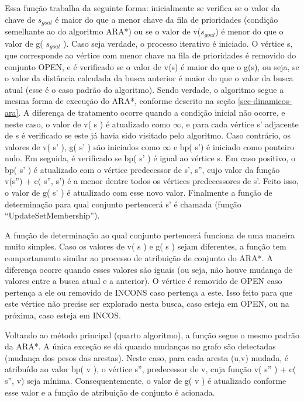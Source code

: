 Essa função trabalha da seguinte forma: inicialmente se verifica se o valor da chave de $s_{goal}$ é maior do que a menor chave da fila de prioridades (condição semelhante ao do algoritmo ARA*) ou se o valor de v($s_{goal}$) é menor do que o valor de g( $s_{goal}$ ). Caso seja verdade, o processo iterativo é iniciado. O vértice s, que corresponde ao vértice com menor chave na fila de prioridades é removido do conjunto OPEN, e é verificado se o valor de v(s) é maior do que o g(s), ou seja, se o valor da distância calculada da busca anterior é maior do que o valor da busca atual (esse é o caso padrão do algoritmo). Sendo verdade, o algoritmo segue a mesma forma de execução do ARA*, conforme descrito na seção \ref{sec-dinamicos-ara}. A diferença de tratamento ocorre quando a condição inicial não ocorre, e neste caso, o valor de v( s ) é atualizado como $\infty$, e para cada vértice s' adjacente de s é verificado se este já havia sido visitado pelo algoritmo. Caso contrário, os valores de v( s' ), g( s' ) são iniciados como $\infty$ e bp( s') é iniciado como ponteiro nulo. Em seguida, é verificado se bp( s' ) é igual ao vértice s. Em caso positivo, o bp( s' ) é atualizado com o vértice predecessor de s', s'', cujo valor da função v(s'') + c( s'', s') é a menor dentre todos os vértices predecessores de s'. Feito isso, o valor de g( s' ) é atualizado com esse novo valor. Finalmente a função de determinação para qual conjunto pertencerá s' é chamada (função ``UpdateSetMembership'').

A função de determinação ao qual conjunto pertencerá funciona de uma maneira muito simples. Caso os valores de v( s ) e g( s ) sejam diferentes, a função tem comportamento similar ao processo de atribuição de conjunto do ARA*. A diferença ocorre quando esses valores são iguais (ou seja, não houve mudança de valores entre a busca atual e a anterior). O vértice é removido de OPEN caso pertença a ele ou removido de INCONS caso pertença a este. Isso feito para que este vértice não precise ser explorado nesta busca, caso esteja em OPEN, ou na próxima, caso esteja em INCOS.

Voltando ao método principal (quarto algoritmo), a função segue o mesmo padrão da ARA*. A única exceção se dá quando mudanças no grafo são detectadas (mudança dos pesos das arestas). Neste caso, para cada aresta (u,v) mudada, é atribuído ao valor bp( v ), o vértice s'', predecessor de v, cuja função v( s'' ) + c( s'', v) seja mínima. Consequentemente, o valor de g( v ) é atualizado conforme esse valor e a função de atribuição de conjunto é acionada. 
